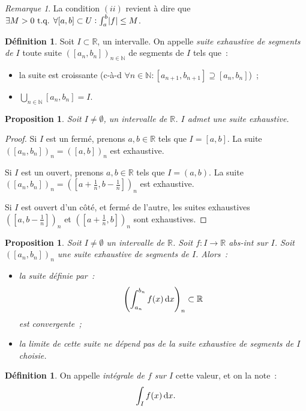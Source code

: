\documentclass{report}
\newtheorem{prp}[thm]{Proposition}
\theoremstyle{definition}
\newtheorem{déf}[thm]{Définition}
\theoremstyle{remark}
\newtheorem*{rmq}{Remarque}
\newcommand{\R}{\mathbb R}
\newcommand{\N}{\mathbb N}
\newcommand{\tq}{\text{ t.q. }}
\begin{document}
			\begin{rmq} La condition $(ii)$ revient à dire que $\exists M > 0 \tq \forall [a, b] \subset U : \int_a^b \abs f \leq M$.
			\end{rmq}

			\begin{déf} Soit $I \subset \R$, un intervalle. On appelle \textit{suite exhaustive de segments de $I$} toute suite $([a_n, b_n])_{n \in \N}$ de
			segments de $I$ tels que~:
			\begin{itemize}
				\item[$(i)$]  la suite est croissante (c-à-d $\forall n \in \N : [a_{n+1}, b_{n+1}] \supseteq [a_n, b_n]$)~;
				\item[$(ii)$] $\bigcup_{n \in \N}[a_n, b_n] = I$.
			\end{itemize}
			\end{déf}

			\begin{prp} Soit $I \neq \emptyset$, un intervalle de $\R$. $I$ admet une suite exhaustive.
			\end{prp}

			\begin{proof} Si $I$ est un fermé, prenons $a, b \in \R$ tels que $I = [a, b]$. La suite $([a_n, b_n])_n = ([a, b])_n$ est exhaustive.

			Si $I$ est un ouvert, prenons $a, b \in \R$ tels que $I = (a, b)$. La suite $([a_n, b_n])_n = ([a + \frac 1n, b - \frac 1n])_n$ est exhaustive.

			Si $I$ est ouvert d'un côté, et fermé de l'autre, les suites exhaustives $([a, b-\frac 1n])_n$ et $([a + \frac 1n, b])_n$ sont exhaustives.
			\end{proof}

			\begin{prp} Soit $I \neq \emptyset$ un intervalle de $\R$. Soit $f : I \to \R$ abs-int sur $I$. Soit $([a_n, b_n])_n$ une suite exhaustive de
			segments de $I$. Alors~:
			\begin{itemize}
				\item[$(i)$]  la suite définie par~:
				\[\left(\int_{a_n}^{b_n}f(x)\dif x\right)_n \subset \R\]
				est convergente~;
				\item[$(ii)$] la limite de cette suite ne dépend pas de la suite exhaustive de segments de $I$ choisie.
			\end{itemize}
			\end{prp}

			\begin{déf} On appelle \textit{intégrale de $f$ sur $I$} cette valeur, et on la note~:
			\[\int_I f(x)\dif x.\]
			\end{déf}
\end{document}

